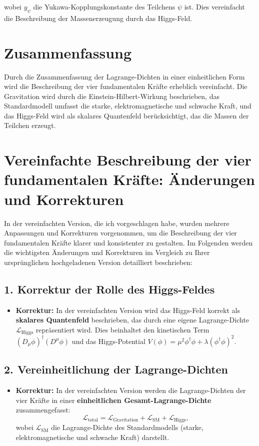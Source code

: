 \documentclass{article}
\begin{document}
wobei $y_\psi$ die Yukawa-Kopplungskonstante des Teilchens $\psi$ ist. Dies vereinfacht die Beschreibung der Massenerzeugung durch das Higgs-Feld.

\section{Zusammenfassung}

Durch die Zusammenfassung der Lagrange-Dichten in einer einheitlichen Form wird die Beschreibung der vier fundamentalen Kräfte erheblich vereinfacht. Die Gravitation wird durch die Einstein-Hilbert-Wirkung beschrieben, das Standardmodell umfasst die starke, elektromagnetische und schwache Kraft, und das Higgs-Feld wird als skalares Quantenfeld berücksichtigt, das die Massen der Teilchen erzeugt.
\section{Vereinfachte Beschreibung der vier fundamentalen Kräfte: Änderungen und Korrekturen}

In der vereinfachten Version, die ich vorgeschlagen habe, wurden mehrere Anpassungen und Korrekturen vorgenommen, um die Beschreibung der vier fundamentalen Kräfte klarer und konsistenter zu gestalten. Im Folgenden werden die wichtigsten Änderungen und Korrekturen im Vergleich zu Ihrer ursprünglichen hochgeladenen Version detailliert beschrieben:

\subsection{1. Korrektur der Rolle des Higgs-Feldes}

\begin{itemize}
	\item \textbf{Korrektur:} In der vereinfachten Version wird das Higgs-Feld korrekt als \textbf{skalares Quantenfeld} beschrieben, das durch eine eigene Lagrange-Dichte $\mathcal{L}_\text{Higgs}$ repräsentiert wird. Dies beinhaltet den kinetischen Term $(D_\mu \phi)^\dagger (D^\mu \phi)$ und das Higgs-Potential $V(\phi) = \mu^2 \phi^\dagger \phi + \lambda (\phi^\dagger \phi)^2$.
\end{itemize}

\subsection{2. Vereinheitlichung der Lagrange-Dichten}

\begin{itemize}
	\item \textbf{Korrektur:} In der vereinfachten Version werden die Lagrange-Dichten der vier Kräfte in einer \textbf{einheitlichen Gesamt-Lagrange-Dichte} zusammengefasst:
	\[
	\mathcal{L}_\text{total} = \mathcal{L}_\text{Gravitation} + \mathcal{L}_\text{SM} + \mathcal{L}_\text{Higgs},
	\]
	wobei $\mathcal{L}_\text{SM}$ die Lagrange-Dichte des Standardmodells (starke, elektromagnetische und schwache Kraft) darstellt.
\end{itemize}
\end{document}
